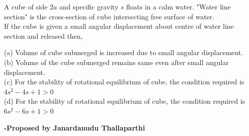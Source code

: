 \documentclass[11pt,a4paper]{scrartcl}
\begin{document}
\begin{problem}

A cube of side $2a$ and specific gravity $s$ floats in a calm water. "Water line section" is the cross-section of cube intersecting free surface of water. \\
If the cube is given a small angular displacement about centre of water line section and released then, 

\begin{center}
    



\end{center}

(a) Volume of cube submerged is increased due to small angular displacement. \\
(b) Volume of the cube submerged remains same even after small angular displacement.\\
(c) For the stability of rotational equilibrium of cube, the condition required is $4s^2 - 4s + 1 >0$ \\
(d) For the stability of rotational equilibrium of cube, the condition required is $6s^2 - 6s + 1 >0$

\end{problem}
\begin{flushright}
\textbf{\Large{-Proposed by Janardanudu Thallaparthi}}
\end{flushright}
\end{document}
